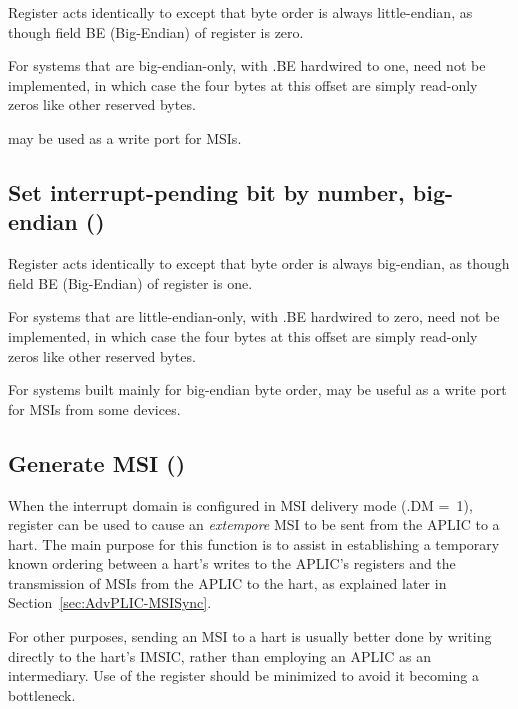 Register  acts identically to  except that
byte order is always little-endian, as though field BE (Big-Endian) of
register  is zero.

For systems that are big-endian-only, with .BE hardwired
to one,  need not be implemented, in which case
the four bytes at this offset are simply read-only zeros like other
reserved bytes.

 may be used as a write port for MSIs.

\subsection{%
Set interrupt-pending bit by number, big-endian ()%
}

Register  acts identically to  except that
byte order is always big-endian, as though field BE (Big-Endian) of
register  is one.

For systems that are little-endian-only, with .BE
hardwired to zero,  need not be implemented, in which
case the four bytes at this offset are simply read-only zeros like
other reserved bytes.

For systems built mainly for big-endian byte order, 
may be useful as a write port for MSIs from some devices.

\subsection{Generate MSI ()}
\label{sec:AdvPLIC-reg-genmsi}

When the interrupt domain is configured in MSI delivery mode
(.DM =~1), register  can be used to cause an
\emph{extempore} MSI to be sent from the APLIC to a hart.
The main purpose for this function is to assist in establishing
a temporary known ordering between a hart's writes to the APLIC's
registers and the transmission of MSIs from the APLIC to the hart, as
explained later in Section~\ref{sec:AdvPLIC-MSISync}.

\begin{commentary}
For other purposes, sending an MSI to a hart is usually better done by
writing directly to the hart's IMSIC, rather than employing an APLIC as
an intermediary.
Use of the  register should be minimized to avoid it becoming
a bottleneck.
\end{commentary}

